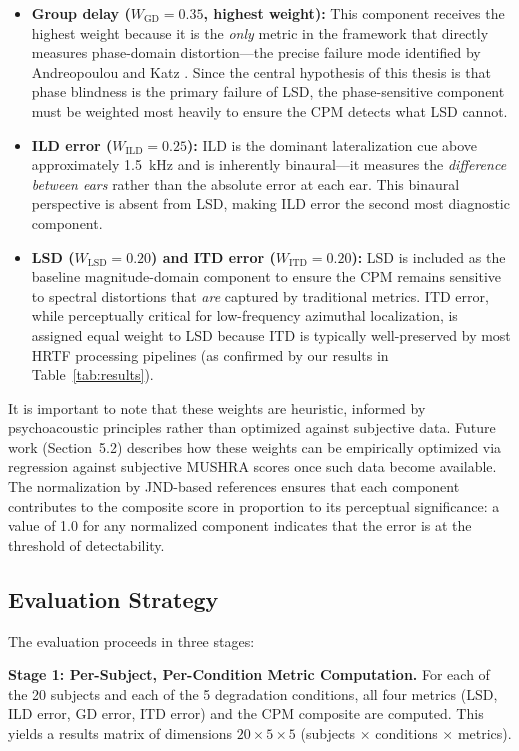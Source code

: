 \documentclass[12pt,a4paper]{article}
\begin{document}
\begin{itemize}
  \item \textbf{Group delay ($W_{\mathrm{GD}} = 0.35$, highest weight):} This component receives the highest weight because it is the \textit{only} metric in the framework that directly measures phase-domain distortion---the precise failure mode identified by Andreopoulou and Katz \cite{andreopoulou2022}. Since the central hypothesis of this thesis is that phase blindness is the primary failure of LSD, the phase-sensitive component must be weighted most heavily to ensure the CPM detects what LSD cannot.
  \item \textbf{ILD error ($W_{\mathrm{ILD}} = 0.25$):} ILD is the dominant lateralization cue above approximately 1.5~kHz \cite{blauert1997} and is inherently binaural---it measures the \textit{difference between ears} rather than the absolute error at each ear. This binaural perspective is absent from LSD, making ILD error the second most diagnostic component.
  \item \textbf{LSD ($W_{\mathrm{LSD}} = 0.20$) and ITD error ($W_{\mathrm{ITD}} = 0.20$):} LSD is included as the baseline magnitude-domain component to ensure the CPM remains sensitive to spectral distortions that \textit{are} captured by traditional metrics. ITD error, while perceptually critical for low-frequency azimuthal localization, is assigned equal weight to LSD because ITD is typically well-preserved by most HRTF processing pipelines (as confirmed by our results in Table~\ref{tab:results}).
\end{itemize}

It is important to note that these weights are heuristic, informed by psychoacoustic principles rather than optimized against subjective data. Future work (Section~5.2) describes how these weights can be empirically optimized via regression against subjective MUSHRA scores once such data become available. The normalization by JND-based references ensures that each component contributes to the composite score in proportion to its perceptual significance: a value of 1.0 for any normalized component indicates that the error is at the threshold of detectability.

\subsection{Evaluation Strategy}

The evaluation proceeds in three stages:

\textbf{Stage 1: Per-Subject, Per-Condition Metric Computation.}
For each of the 20 subjects and each of the 5 degradation conditions, all four metrics (LSD, ILD error, GD error, ITD error) and the CPM composite are computed. This yields a results matrix of dimensions $20 \times 5 \times 5$ (subjects $\times$ conditions $\times$ metrics).
\end{document}
